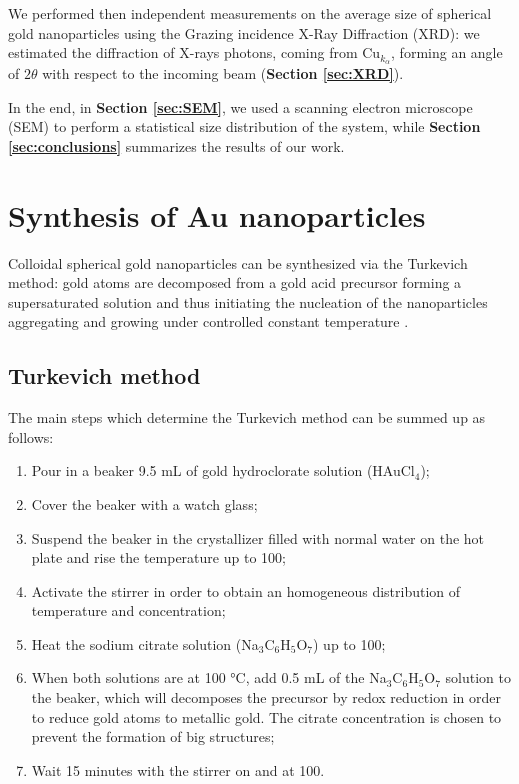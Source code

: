 \documentclass[twocolumn]{article}
\begin{document}
\begin{multicols}{2}
We performed then independent measurements on the average size of spherical gold nanoparticles using the Grazing incidence X-Ray Diffraction (XRD): we estimated the diffraction of X-rays photons, coming from \(\text{Cu}_{k_\alpha}\), forming an angle of \(2\theta\) with respect to the incoming beam (\textbf{Section \ref{sec:XRD}}).

In the end, in \textbf{Section \ref{sec:SEM}}, we used a scanning electron microscope (SEM) to perform a statistical size distribution of the system, while \textbf{Section \ref{sec:conclusions}} summarizes the results of our work.

\newpage

\section{Synthesis of Au nanoparticles}
\label{sec:synthesis}
\noindent
Colloidal spherical gold nanoparticles can be synthesized via the Turkevich method: gold atoms are decomposed from a gold acid precursor forming a supersaturated solution and thus initiating the nucleation of the nanoparticles aggregating and growing under controlled constant temperature \cite{Kimling2006}.

\subsection{Turkevich method}
The main steps which determine the Turkevich method can be summed up as follows:

\begin{enumerate}
    \item Pour in a beaker 9.5 mL of gold hydroclorate solution (HAuCl$_4$);
    \item Cover the beaker with a watch glass;
    \item Suspend the beaker in the crystallizer filled with normal water on the hot plate and rise the temperature up to 100\degreecelsius;
    \item Activate the stirrer in order to obtain an homogeneous distribution of temperature and concentration;
    \item Heat the sodium citrate solution (Na$_3$C$_6$H$_5$O$_7$) up to 100\degreecelsius;
    \item When both solutions are at 100 °C, add 0.5 mL of the Na$_3$C$_6$H$_5$O$_7$ solution to the beaker, which will decomposes the precursor by redox reduction in order to reduce gold atoms to metallic gold. The citrate concentration is chosen to prevent the formation of big structures;
    \item Wait 15 minutes with the stirrer on and at 100\degreecelsius.
\end{enumerate}


\end{multicols}
\end{document}
